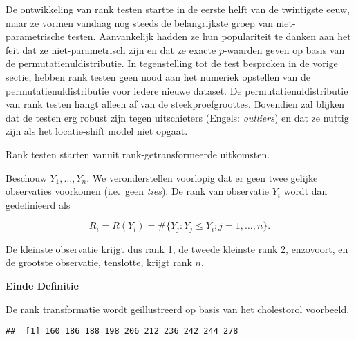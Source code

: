 \documentclass[12pt,dutch,coursenotes]{book}
\newenvironment{Shaded}{\begin{snugshade}}{\end{snugshade}}
\newcommand{\KeywordTok}[1]{\textcolor[rgb]{0.13,0.29,0.53}{\textbf{#1}}}
\newcommand{\OperatorTok}[1]{\textcolor[rgb]{0.81,0.36,0.00}{\textbf{#1}}}
\newcommand{\NormalTok}[1]{#1}
\theoremstyle{definition}
\theoremstyle{definition}
\theoremstyle{definition}
\theoremstyle{remark}
\let\BeginKnitrBlock\begin \let\EndKnitrBlock\end
\begin{document}
De ontwikkeling van rank testen startte in de eerste helft van de
twintigste eeuw, maar ze vormen vandaag nog steeds de belangrijkste
groep van niet-parametrische testen. Aanvankelijk hadden ze hun
populariteit te danken aan het feit dat ze niet-parametrisch zijn en dat
ze exacte \(p\)-waarden geven op basis van de permutatienuldistributie.
In tegenstelling tot de test besproken in de vorige sectie, hebben rank
testen geen nood aan het numeriek opstellen van de
permutatienuldistributie voor iedere nieuwe dataset. De
permutatienuldistributie van rank testen hangt alleen af van de
steekproefgroottes. Bovendien zal blijken dat de testen erg robust zijn
tegen uitschieters (Engels: \emph{outliers}) en dat ze nuttig zijn als
het locatie-shift model niet opgaat.

Rank testen starten vanuit rank-getransformeerde uitkomsten.

\BeginKnitrBlock{definition}[Rank]
\protect\hypertarget{def:unnamed-chunk-116}{}{\label{def:unnamed-chunk-116}
\iffalse (Rank) \fi{} }Beschouw \(Y_1, \ldots, Y_n\). We veronderstellen
voorlopig dat er geen twee gelijke observaties voorkomen (i.e.~geen
\emph{ties}). De rank van observatie \(Y_i\) wordt dan gedefinieerd als

\begin{equation*}
   R_i=R(Y_i) = \#\{Y_j: Y_j\leq Y_i; j=1,\ldots, n\}.
  \end{equation*}

De kleinste observatie krijgt dus rank 1, de tweede kleinste rank 2,
enzovoort, en de grootste observatie, tenslotte, krijgt rank \(n\).

\textbf{Einde Definitie}
\EndKnitrBlock{definition}

De rank transformatie wordt geïllustreerd op basis van het cholestorol
voorbeeld.

\begin{Shaded}
\end{Shaded}

\begin{verbatim}
##  [1] 160 186 188 198 206 212 236 242 244 278
\end{verbatim}

\begin{Shaded}
\end{Shaded}
\end{document}
